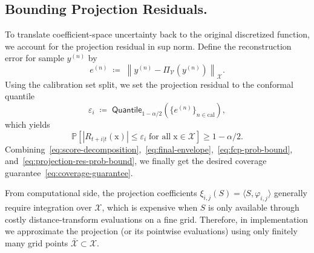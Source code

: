 \documentclass[lettersize,journal]{IEEEtran}
\begin{document}
\subsection{Bounding Projection Residuals.}
To translate coefficient-space uncertainty back to the original discretized function,
we account for the projection residual in sup norm.
Define the reconstruction error for sample $y^{(n)}$ by
\begin{equation*}
e^{(n)} \;\coloneqq\; \left\|y^{(n)} - \Pi_{\mathscr{V}}  \left( y^{(n)} \right) \right\|_{\mathcal{X}}.
\end{equation*}
Using the calibration set split, we set the projection residual to the conformal quantile
\begin{equation}
\varepsilon_i \;\coloneqq\; \mathsf{Quantile}_{1-\alpha/2}( \{e^{(n)}\}_{n\in\mathrm{cal}} ),
\label{eq:epsilon_quantile}
\end{equation}
which yields
\begin{equation}\label{eq:projection-res-prob-bound}
\mathbb{P}\left[ |R_{t+i|t}(\mathrm{x})| \leq \varepsilon_i \; \text{for all}\; \mathrm{x}\in \mathcal{X} \right] \geq 1 - \alpha/2.
\end{equation}
Combining~\eqref{eq:score-decomposition},~\eqref{eq:final-envelope},~\eqref{eq:fcp-prob-bound}, and~\eqref{eq:projection-res-prob-bound}, we finally get the desired coverage guarantee~\eqref{eq:coverage-guarantee}.

From computational side, the projection coefficients $\xi_{i,j}(S)=\langle S,\varphi_{i,j}\rangle$ generally require
integration over $\mathcal X$, which is expensive when $S$ is only available through costly
distance-transform evaluations on a fine grid.
Therefore, in implementation we approximate the projection (or its pointwise evaluations)
using only finitely many grid points $\bar{\mathcal X}\subset\mathcal X$.


\end{document}
